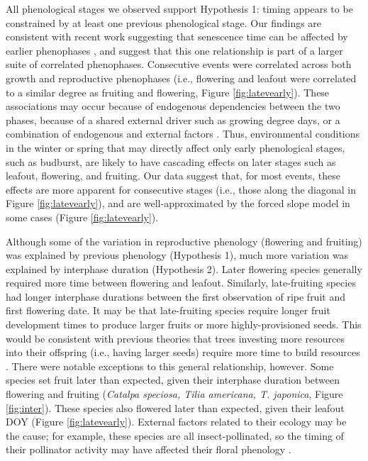 \documentclass{article}
\begin{document}
\par All phenological stages we observed support Hypothesis 1: timing appears to be constrained by at least one previous phenological stage. Our findings are consistent with recent work suggesting that senescence time can be affected by earlier phenophases \citep{keenan2015,liu2016}, and suggest that this one relationship is part of a larger suite of correlated phenophases. Consecutive events were correlated across both growth and reproductive phenophases (i.e., flowering and leafout were correlated to a similar degree as fruiting and flowering, Figure \ref{fig:latevearly}). These associations may occur because of endogenous dependencies between the two phases, because of a shared external driver such as growing degree days, or a combination of endogenous and external factors \citep{lechowicz1995}. Thus, environmental conditions in the winter or spring that may directly affect only early phenological stages, such as budburst, are likely to have cascading effects on later stages such as leafout, flowering, and fruiting. Our data suggest that, for most events, these effects are more apparent for consecutive stages (i.e., those along the diagonal in Figure \ref{fig:latevearly}), and are well-approximated by the forced slope model in some cases (Figure \ref{fig:latevearly}).

\par Although some of the variation in reproductive phenology (flowering and fruiting) was explained by previous phenology (Hypothesis 1), much more variation was explained by interphase duration (Hypothesis 2). Later flowering species generally required more time between flowering and leafout. Similarly, late-fruiting species had longer interphase durations between the first observation of ripe fruit and first flowering date. It may be that late-fruiting species require longer fruit development times to produce larger fruits or more highly-provisioned seeds. This would be consistent with previous theories that trees investing more resources into their offspring (i.e., having larger seeds) require more time to build resources \citep{bolmgren2008,sun2011}. There were notable exceptions to this general relationship, however. Some species set fruit later than expected, given their interphase duration between flowering and fruiting (\textit{Catalpa speciosa, Tilia americana, T. japonica}, Figure \ref{fig:inter}). These species also flowered later than expected, given their leafout DOY (Figure \ref{fig:latevearly}). External factors related to their ecology may be the cause; for example, these species are all insect-pollinated, so the timing of their pollinator activity may have affected their floral phenology \citep{elzinga2007}. 
\end{document}
